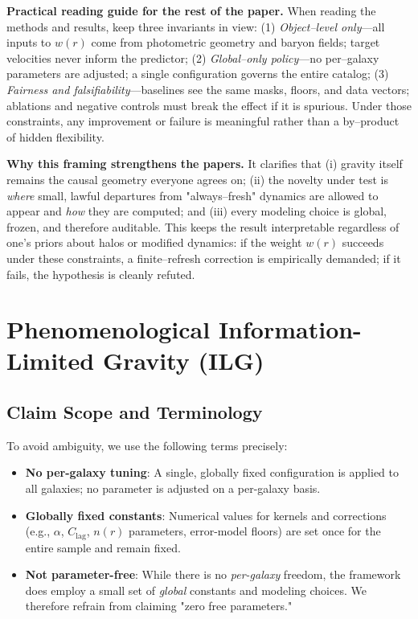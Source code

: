\documentclass[usenatbib]{mnras}
\begin{document}
\vspace{0.5em}
\noindent\textbf{Practical reading guide for the rest of the paper.}
When reading the methods and results, keep three invariants in view:
(1) \emph{Object–level only}—all inputs to \(w(r)\) come from photometric geometry and baryon fields; target velocities never inform the predictor;
(2) \emph{Global–only policy}—no per–galaxy parameters are adjusted; a single configuration governs the entire catalog;
(3) \emph{Fairness and falsifiability}—baselines see the same masks, floors, and data vectors; ablations and negative controls must break the effect if it is spurious.
Under those constraints, any improvement or failure is meaningful rather than a by–product of hidden flexibility.

\vspace{0.5em}
\noindent\textbf{Why this framing strengthens the papers.}
It clarifies that (i) gravity itself remains the causal geometry everyone agrees on; (ii) the novelty under test is \emph{where} small, lawful departures from "always–fresh" dynamics are allowed to appear and \emph{how} they are computed; and (iii) every modeling choice is global, frozen, and therefore auditable.
This keeps the result interpretable regardless of one's priors about halos or modified dynamics: if the weight \(w(r)\) succeeds under these constraints, a finite–refresh correction is empirically demanded; if it fails, the hypothesis is cleanly refuted.

\section{Phenomenological Information-Limited Gravity (ILG)}

\subsection*{Claim Scope and Terminology}
\noindent To avoid ambiguity, we use the following terms precisely:
\begin{itemize}
  \item \textbf{No per-galaxy tuning}: A single, globally fixed configuration is applied to all galaxies; no parameter is adjusted on a per-galaxy basis.
  \item \textbf{Globally fixed constants}: Numerical values for kernels and corrections (e.g., $\alpha$, $C_\mathrm{lag}$, $n(r)$ parameters, error-model floors) are set once for the entire sample and remain fixed.
  \item \textbf{Not parameter-free}: While there is no \emph{per-galaxy} freedom, the framework does employ a small set of \emph{global} constants and modeling choices. We therefore refrain from claiming "zero free parameters."
\end{itemize}
\end{document}
